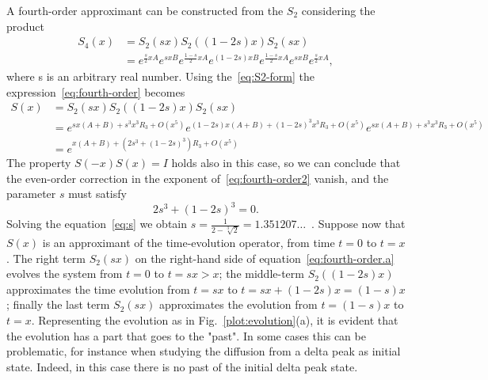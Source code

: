 A fourth-order approximant can be constructed from the $S_2$ considering the product
\begin{subequations} \label{eq:fourth-order}
\begin{align} \label{eq:fourth-order.a}
S_4(x) &= S_2(sx) S_2((1-2s)x) S_2(sx) \\
&= e^{\frac{s}{2}xA} e^{sxB} e^{\frac{1-s}{2}xA} e^{(1-2s)xB} e^{\frac{1-s}{2}xA} e^{sxB} e^{\frac{s}{2}xA},
\end{align}
\end{subequations}
where s is an arbitrary real number. Using the~\eqref{eq:S2-form} the expression~\eqref{eq:fourth-order} becomes
\begin{subequations} \label{eq:fourth-order2}
\begin{align} 
S(x) &= S_2(sx) S_2((1-2s)x) S_2(sx)	 \\
&= e^{sx(A+B) + s^3x^3R_3 + O(x^5)} e^{(1-2s)x(A+B) + (1-2s)^3x^3R_3 + O(x^5)} e^{sx(A+B) + s^3x^3R_3 + O(x^5)} \\
&= e^{x(A+B)+(2s^3+(1-2s)^3)R_3+O(x^5)} \label{eq:fourth-order2.3}
\end{align}
\end{subequations}
The property $S(-x)S(x) = I$ holds also in this case, so we can conclude that the even-order correction in the exponent of~\eqref{eq:fourth-order2} vanish, and the parameter $s$ must satisfy
\begin{equation} \label{eq:s}
2s^3 + (1-2s)^3 = 0.
\end{equation}
Solving the equation~\eqref{eq:s} we obtain $s = \frac{1}{2-\sqrt[3]{2}} = 1.351207\ldots$~. Suppose now that $S(x)$ is an approximant of the time-evolution operator, from time $t=0$ to $t=x$. The right term $S_2(sx)$ on the right-hand side of equation~\eqref{eq:fourth-order.a} evolves the system from $t=0$ to $t=sx>x$; the middle-term $S_2((1-2s)x)$ approximates the time evolution from $t=sx$ to $t=sx + (1-2s)x = (1-s)x$; finally the last term $S_2(sx)$ approximates the evolution from $t=(1-s)x$ to $t=x$. Representing the evolution as in Fig.~\ref{plot:evolution}(a), it is evident that the evolution has a part that goes to the "past". In some cases this can be problematic, for instance when studying the diffusion from a delta peak as initial state. Indeed, in this case there is no past of the initial delta peak state. 

